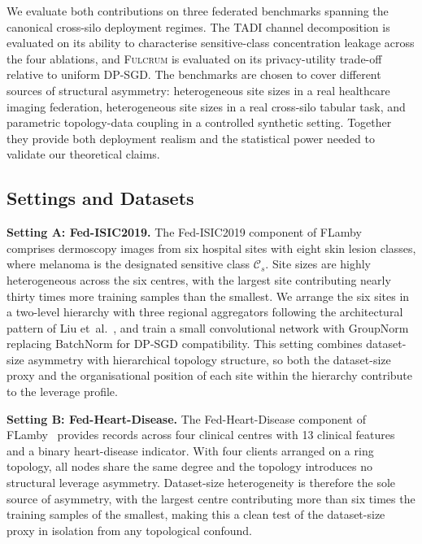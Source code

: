 \documentclass[letterpaper,journal]{IEEEtran}
\newcommand{\TADI}{\textsc{TADI}\xspace}
\newcommand{\Fulcrum}{\textsc{Fulcrum}\xspace}
\begin{document}
We evaluate both contributions on three federated benchmarks spanning
the canonical cross-silo deployment regimes. The \TADI channel
decomposition is evaluated on its ability to characterise
sensitive-class concentration leakage across the four ablations, and
\Fulcrum is evaluated on its privacy-utility trade-off relative to
uniform DP-SGD. The benchmarks are chosen to cover different sources
of structural asymmetry: heterogeneous site sizes in a real
healthcare imaging federation, heterogeneous site sizes in a real
cross-silo tabular task, and parametric topology-data coupling in a
controlled synthetic setting. Together they provide both deployment
realism and the statistical power needed to validate our theoretical
claims.

\subsection{Settings and Datasets}
\label{sec:experiments-settings}

\noindent\textbf{Setting A: Fed-ISIC2019.}
The Fed-ISIC2019 component of FLamby~\cite{flamby2022} comprises
dermoscopy images from six hospital sites with eight skin lesion
classes, where melanoma is the designated sensitive class
$\mathcal{C}_s$. Site sizes are highly heterogeneous across the six
centres, with the largest site contributing nearly thirty times more
training samples than the smallest. We arrange the six sites in a
two-level hierarchy with three regional aggregators following the
architectural pattern of Liu et~al.~\cite{liu2020hierarchical}, and
train a small convolutional network with GroupNorm replacing
BatchNorm for DP-SGD compatibility. This setting combines
dataset-size asymmetry with hierarchical topology structure, so both
the dataset-size proxy and the organisational position of each site
within the hierarchy contribute to the leverage
profile.\medskip

\noindent\textbf{Setting B: Fed-Heart-Disease.}
The Fed-Heart-Disease component of FLamby~\cite{flamby2022} provides
records across four clinical centres with 13 clinical features and a
binary heart-disease indicator. With four clients arranged on a ring
topology, all nodes share the same degree and the topology
introduces no structural leverage asymmetry. Dataset-size
heterogeneity is therefore the sole source of asymmetry, with the
largest centre contributing more than six times the training samples
of the smallest, making this a clean test of the dataset-size proxy
in isolation from any topological confound.\medskip
\end{document}
